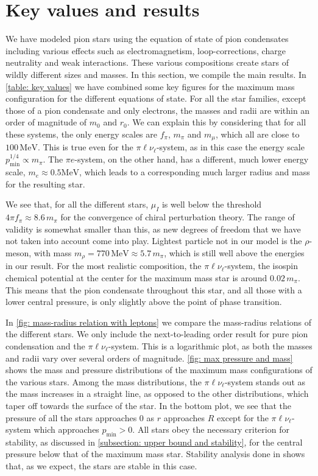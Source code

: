 \section{Key values and results}

We have modeled pion stars using the equation of state of pion condensates including various effects such as electromagnetism, loop-corrections, charge neutrality and weak interactions.
These various compositions create stars of wildly different sizes and masses.
In this section, we compile the main results.
In \autoref{table: key values} we have combined some key figures for the maximum mass configuration for the different equations of state.
For all the star families, except those of a pion condensate and only electrons, the masses and radii are within an order of magnitude of $m_0$ and $r_0$.
We can explain this by considering that for all these systems, the only energy scales are $f_\pi$, $m_\pi$ and $m_\mu$, which all are close to $100\,\text{MeV}$.
This is true even for the $\pi\ell\nu_\ell$-system, as in this case the energy scale $p_\text{min}^{1/4}\propto m_\pi$.
The $\pi e$-system, on the other hand, has a different, much lower energy scale, $m_e \approx 0.5 \text{MeV}$, which leads to a corresponding much larger radius and mass for the resulting star.

We see that, for all the different stars, $\mu_I$ is well below the threshold $4\pi f_\pi \approx 8.6 \, m_\pi$ for the convergence of chiral perturbation theory.
The range of validity is somewhat smaller than this, as new degrees of freedom that we have not taken into account come into play.
Lightest particle not in our model is the $\rho$-meson, with mass $m_\rho = 770 \, \text{MeV} \approx 5.7 \, m_\pi$, which is still well above the energies in our result.
For the most realistic composition, the $\pi\ell\nu_\ell$-system, the isospin chemical potential at the center for the maximum mass star is around $0.02\,m_\pi$.
This means that the pion condensate throughout this star, and all those with a lower central pressure, is only slightly above the point of phase transition.

In \autoref{fig: mass-radius relation with leptons} we compare the mass-radius relations of the different stars.
We only include the next-to-leading order result for pure pion condensation and the $\pi \ell \nu_\ell$-system.
This is a logarithmic plot, as both the masses and radii vary over several orders of magnitude.
\autoref{fig: max pressure and mass} shows the mass and pressure distributions of the maximum mass configurations of the various stars.
Among the mass distributions, the $\pi\ell\nu_\ell$-system stands out as the mass increases in a straight line, as opposed to the other distributions, which taper off towards the surface of the star.
In the bottom plot, we see that the pressure of all the stars approaches $0$ as $r$ approaches $R$ except for the $\pi\ell\nu_\ell$-system which approaches $p_\text{min}>0$.
All stars obey the necessary criterion for stability, as discussed in \autoref{subsection: upper bound and stability}, for the central pressure below that of the maximum mass star.
Stability analysis done in \autocite{brandtNewClassCompact2018} shows that, as we expect, the stars are stable in this case.





